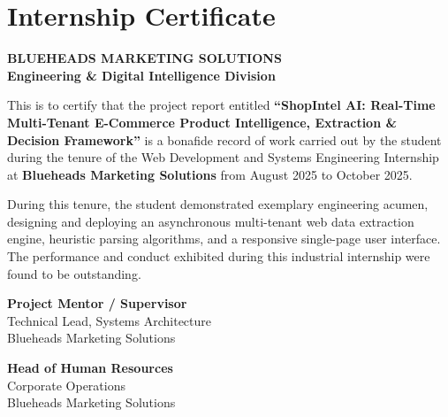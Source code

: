 \documentclass[12pt,a4paper,oneside]{report}
\begin{document}

\chapter*{Internship Certificate}
\begin{center}
    \textbf{\Large BLUEHEADS MARKETING SOLUTIONS}\\[0.2cm]
    \textbf{\large Engineering \& Digital Intelligence Division}\\[1.0cm]
\end{center}

This is to certify that the project report entitled \textbf{``ShopIntel AI: Real-Time Multi-Tenant E-Commerce Product Intelligence, Extraction \& Decision Framework''} is a bonafide record of work carried out by the student during the tenure of the Web Development and Systems Engineering Internship at \textbf{Blueheads Marketing Solutions} from August 2025 to October 2025.

During this tenure, the student demonstrated exemplary engineering acumen, designing and deploying an asynchronous multi-tenant web data extraction engine, heuristic parsing algorithms, and a responsive single-page user interface. The performance and conduct exhibited during this industrial internship were found to be outstanding.

\vspace{2.5cm}

\noindent
\begin{minipage}{0.45\textwidth}
    \begin{flushleft}
        \textbf{Project Mentor / Supervisor}\\
        Technical Lead, Systems Architecture\\
        Blueheads Marketing Solutions
    \end{flushleft}
\end{minipage}
\hfill
\begin{minipage}{0.45\textwidth}
    \begin{flushright}
        \textbf{Head of Human Resources}\\
        Corporate Operations\\
        Blueheads Marketing Solutions
    \end{flushright}
\end{minipage}
\end{document}
